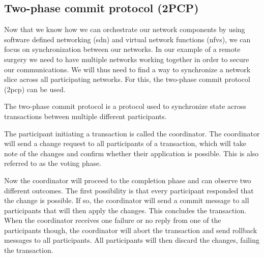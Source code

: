 
\subsection{Two-phase commit protocol (2PCP)}
Now that we know how we can orchestrate our network components by using software defined networking (\acrshort{sdn}) and virtual network functions (\acrshort{nfv}s), we can focus on synchronization between our networks. In our example of a remote surgery we need to have multiple networks working together in order to secure our communications. We will thus need to find a way to synchronize a network slice across all participating networks. For this, the two-phase commit protocol (\acrshort{2pcp}) can be used.

The two-phase commit protocol \cite{2pcp} is a protocol used to synchronize state across transactions between multiple different participants.

The participant initiating a transaction is called the coordinator. The coordinator will send a change request to all participants of a transaction, which will take note of the changes and confirm whether their application is possible. This is also referred to as the voting phase.

Now the coordinator will proceed to the completion phase and can observe two different outcomes. The first possibility is that every participant responded that the change is possible. If so, the coordinator will send a commit message to all participants that will then apply the changes. This concludes the transaction. When the coordinator receives one failure or no reply from one of the participants though, the coordinator will abort the transaction and send rollback messages to all participants. All participants will then discard the changes, failing the transaction.

